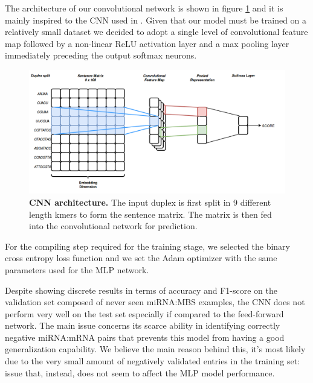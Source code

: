 The architecture of our convolutional network is shown in figure \ref{fig:cnn} and it is mainly inspired to the CNN used in \cite{cnn_arch}. Given that our model must be trained on a relatively small dataset we decided to adopt a single level of convolutional feature map followed by a non-linear ReLU activation layer and a max pooling layer immediately preceding the output softmax neurons. 

\begin{figure}[hbt!]
	\centering
	\includegraphics[width=\textwidth, height=0.4\textheight]{Figures/cnn_arch}
	\caption{\textbf{CNN architecture.} The input duplex is first split in 9 different length kmers to form the sentence matrix. The matrix is then fed into the convolutional network for prediction.}
	\label{fig:cnn}
\end{figure}     

For the compiling step required for the training stage, we selected the binary cross entropy loss function and we set the Adam optimizer with the same parameters used for the MLP network.

Despite showing discrete results in terms of accuracy and F1-score on the validation set composed of never seen miRNA:MBS examples, the CNN does not perform very well on the test set especially if compared to the feed-forward network. The main issue
concerns its scarce ability in identifying correctly negative miRNA:mRNA pairs that prevents this model from having a good generalization capability. We believe the main reason behind this, it's most likely due to the very small amount of negatively validated entries in the training set: issue that, instead, does not seem to affect the MLP model performance.

  


